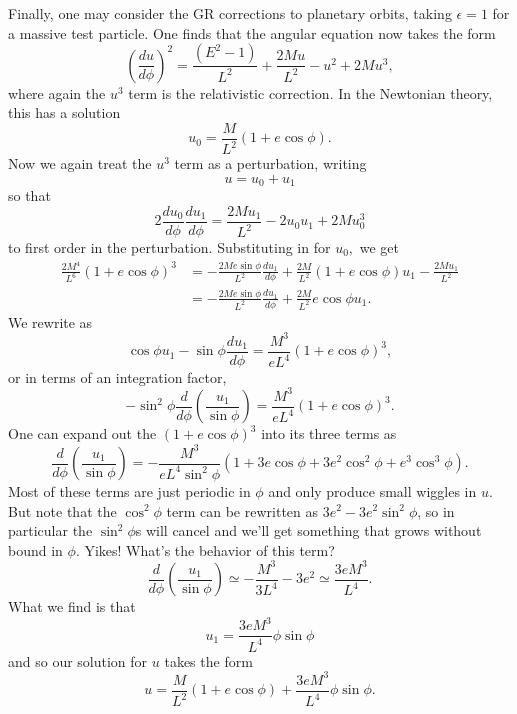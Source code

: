 Finally, one may consider the GR corrections to planetary orbits, taking $\epsilon=1$ for a massive test particle. One finds that the angular equation now takes the form
$$\left(\frac{du}{d\phi}\right)^2=\frac{(E^2-1)}{L^2}+\frac{2Mu}{L^2}-u^2+2Mu^3,$$
where again the $u^3$ term is the relativistic correction. In the Newtonian theory, this has a solution
$$u_0=\frac{M}{L^2}(1+e\cos\phi).$$
Now we again treat the $u^3$ term as a perturbation, writing
$$u=u_0+u_1$$
so that
$$2\frac{du_0}{d\phi}\frac{du_1}{d\phi}=\frac{2Mu_1}{L^2}-2u_0u_1+2Mu_0^3$$
to first order in the perturbation. Substituting in for $u_0,$ we get
\begin{align*}
    \frac{2M^4}{L^6}(1+e\cos\phi)^3&= -\frac{2Me\sin\phi}{L^2}\frac{du_1}{d\phi}+\frac{2M}{L^2}(1+e\cos\phi)u_1-\frac{2Mu_1}{L^2}\\
    &=-\frac{2Me\sin\phi}{L^2}\frac{du_1}{d\phi}+\frac{2M}{L^2}e\cos\phi u_1.
\end{align*}
We rewrite as
$$\cos\phi u_1 -\sin\phi\frac{du_1}{d\phi}=\frac{M^3}{eL^4}(1+e\cos\phi)^3,$$
or in terms of an integration factor,
$$-\sin^2\phi \frac{d}{d\phi}(\frac{u_1}{\sin\phi})=\frac{M^3}{eL^4}(1+e\cos\phi)^3.$$
One can expand out the $(1+e\cos\phi)^3$ into its three terms as
$$\frac{d}{d\phi}(\frac{u_1}{\sin\phi})=-\frac{M^3}{eL^4\sin^2\phi}(1+3e\cos\phi+3e^2\cos^2\phi+e^3\cos^3\phi).$$
Most of these terms are just periodic in $\phi$ and only produce small wiggles in $u$. But note that the $\cos^2\phi$ term can be rewritten as $3e^2-3e^2\sin^2\phi$, so in particular the $\sin^2\phi$s will cancel and we'll get something that grows without bound in $\phi$. Yikes! What's the behavior of this term?
$$\frac{d}{d\phi}(\frac{u_1}{\sin\phi})\simeq -\frac{M^3}{3L^4}-3e^2 \simeq \frac{3eM^3}{L^4}.$$
What we find is that
$$u_1=\frac{3eM^3}{L^4}\phi \sin\phi$$
and so our solution for $u$ takes the form
$$u=\frac{M}{L^2}(1+e\cos\phi)+\frac{3e M^3}{L^4}\phi\sin\phi.$$